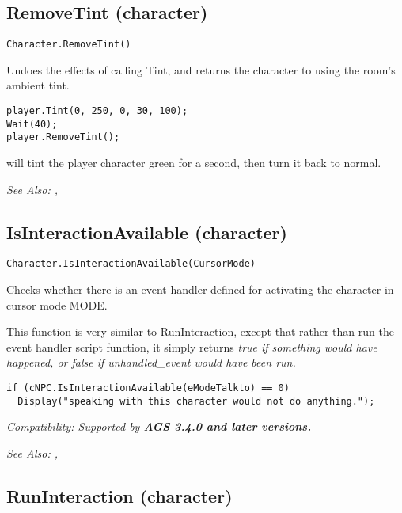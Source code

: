 \subsection{RemoveTint (character)}\label{Character.RemoveTint}%

\begin{verbatim}
Character.RemoveTint()
\end{verbatim}

Undoes the effects of calling Tint, and returns the character to using the room's ambient tint.

\begin{verbatim}
player.Tint(0, 250, 0, 30, 100);
Wait(40);
player.RemoveTint();
\end{verbatim}
will tint the player character green for a second, then turn it back to normal.

\it{See Also:} ,


\subsection{IsInteractionAvailable (character)}\label{Character.IsInteractionAvailable}%

\begin{verbatim}
Character.IsInteractionAvailable(CursorMode)
\end{verbatim}
Checks whether there is an event handler defined for activating the character
in cursor mode MODE.

This function is very similar to RunInteraction, except that rather than run the event
handler script function, it simply returns \it{true} if something would have happened,
or \it{false} if unhandled_event would have been run.

\begin{verbatim}
if (cNPC.IsInteractionAvailable(eModeTalkto) == 0)
  Display("speaking with this character would not do anything.");
\end{verbatim}

\it{Compatibility:} Supported by \bf{AGS 3.4.0} and later versions.

\it{See Also:} ,


\subsection{RunInteraction (character)}\label{Character.RunInteraction}%

